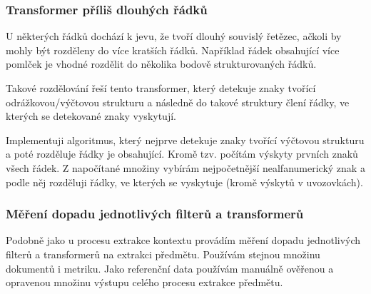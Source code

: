 \documentclass[thesis=M,czech]{FITthesis}[2019/12/23]
\begin{document}
\subsubsection{Transformer příliš dlouhých řádků}
\label{sec:too_long_lines_transformer}

U některých řádků dochází k jevu, že tvoří dlouhý souvislý řetězec, ačkoli by mohly být rozděleny do více kratších řádků. Například řádek obsahující více pomlček je vhodné rozdělit do několika bodově strukturovaných řádků.

Takové rozdělování řeší tento transformer, který detekuje znaky tvořící odrážkovou/výčtovou strukturu a následně do takové struktury člení řádky, ve kterých se detekované znaky vyskytují.

Implementuji algoritmus, který nejprve detekuje znaky tvořící výčtovou strukturu a poté rozděluje řádky je obsahující. Kromě tzv.  počítám výskyty prvních znaků všech řádek. Z napočítané množiny vybírám nejpočetnější nealfanumerický znak a podle něj rozděluji řádky, ve kterých se vyskytuje (kromě výskytů v uvozovkách).

\subsubsection{Měření dopadu jednotlivých filterů a transformerů}
\label{sec:filter_transformer_measurements}

Podobně jako u procesu extrakce kontextu provádím měření dopadu jednotlivých filterů a transformerů na extrakci předmětu. Používám stejnou množinu dokumentů i metriku. Jako referenční data používám manuálně ověřenou a opravenou množinu výstupu celého procesu extrakce předmětu.
\end{document}
